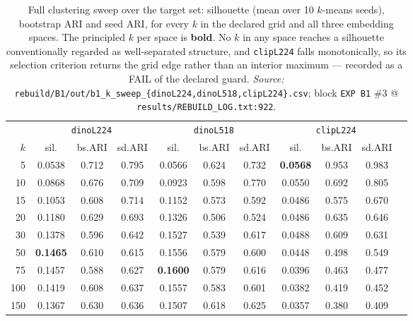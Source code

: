 \begin{table}[h]
\caption{Full clustering sweep over the target set: silhouette (mean over 10 $k$-means seeds),
bootstrap ARI and seed ARI, for every $k$ in the declared grid and all three embedding spaces.
The principled $k$ per space is \textbf{bold}. No $k$ in any space reaches a silhouette conventionally
regarded as well-separated structure, and \texttt{clipL224} falls monotonically, so its selection
criterion returns the grid edge rather than an interior maximum --- recorded as a FAIL of the declared
guard. \emph{Source:} \texttt{rebuild/B1/out/b1\_k\_sweep\_\{dinoL224,dinoL518,clipL224\}.csv};
block \texttt{EXP B1} \#3 @ \texttt{results/REBUILD\_LOG.txt:922}.}
\label{tab:silhouette}
\begin{center}\small
\begin{tabular}{rcccccccccc}
\toprule
& \multicolumn{3}{c}{\texttt{dinoL224}} & \multicolumn{3}{c}{\texttt{dinoL518}} & \multicolumn{3}{c}{\texttt{clipL224}} \\
\cmidrule(lr){2-4}\cmidrule(lr){5-7}\cmidrule(lr){8-10}
$k$ & sil. & bs.ARI & sd.ARI & sil. & bs.ARI & sd.ARI & sil. & bs.ARI & sd.ARI \\
\midrule
5 & 0.0538 & 0.712 & 0.795 & 0.0566 & 0.624 & 0.732 & \textbf{0.0568} & 0.953 & 0.983 \\
10 & 0.0868 & 0.676 & 0.709 & 0.0923 & 0.598 & 0.770 & 0.0550 & 0.692 & 0.805 \\
15 & 0.1053 & 0.608 & 0.714 & 0.1152 & 0.573 & 0.592 & 0.0486 & 0.575 & 0.670 \\
20 & 0.1180 & 0.629 & 0.693 & 0.1326 & 0.506 & 0.524 & 0.0486 & 0.635 & 0.646 \\
30 & 0.1378 & 0.596 & 0.642 & 0.1527 & 0.539 & 0.617 & 0.0488 & 0.609 & 0.631 \\
50 & \textbf{0.1465} & 0.610 & 0.615 & 0.1556 & 0.579 & 0.600 & 0.0448 & 0.498 & 0.549 \\
75 & 0.1457 & 0.588 & 0.627 & \textbf{0.1600} & 0.579 & 0.616 & 0.0396 & 0.463 & 0.477 \\
100 & 0.1419 & 0.608 & 0.637 & 0.1557 & 0.583 & 0.601 & 0.0382 & 0.419 & 0.452 \\
150 & 0.1367 & 0.630 & 0.636 & 0.1507 & 0.618 & 0.625 & 0.0357 & 0.380 & 0.409 \\
\bottomrule
\end{tabular}
\end{center}
\end{table}

